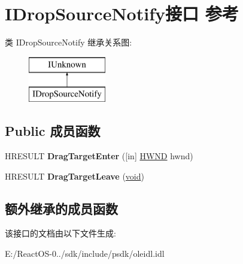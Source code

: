 \hypertarget{interface_i_drop_source_notify}{}\section{I\+Drop\+Source\+Notify接口 参考}
\label{interface_i_drop_source_notify}
类 I\+Drop\+Source\+Notify 继承关系图\+:\begin{figure}[H]
\begin{center}
\leavevmode
\includegraphics[height=2.000000cm]{interface_i_drop_source_notify}
\end{center}
\end{figure}
\subsection*{Public 成员函数}
\begin{DoxyCompactItemize}
\item 
\mbox{\label{interface_i_drop_source_notify_aa153bda6ebc0887c80adeea68d10718e}} 
H\+R\+E\+S\+U\+LT {\bfseries Drag\+Target\+Enter} (\mbox{[}in\mbox{]} \hyperlink{interfacevoid}{H\+W\+ND} hwnd)
\item 
\mbox{\label{interface_i_drop_source_notify_acb2b20c6fb8ba9e1b28ded62a0b34098}} 
H\+R\+E\+S\+U\+LT {\bfseries Drag\+Target\+Leave} (\hyperlink{interfacevoid}{void})
\end{DoxyCompactItemize}
\subsection*{额外继承的成员函数}


该接口的文档由以下文件生成\+:\begin{DoxyCompactItemize}
\item 
E\+:/\+React\+O\+S-\/0../sdk/include/psdk/oleidl.\+idl\end{DoxyCompactItemize}
